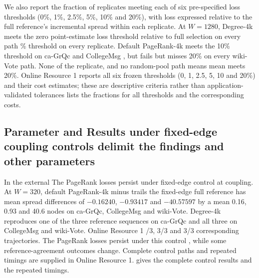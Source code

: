 \documentclass[smallextended]{svjour3}
\providecommand{\DIFaddtex}[1]{{\protect\color{blue} \sf #1}} %
\providecommand{\DIFdeltex}[1]{{\protect\color{red} \scriptsize #1}} %
\providecommand{\DIFaddbegin}{} %
\providecommand{\DIFaddend}{} %
\providecommand{\DIFdelbegin}{} %
\providecommand{\DIFdelend}{} %
\providecommand{\DIFadd}[1]{\texorpdfstring{\DIFaddtex{#1}}{#1}} %
\providecommand{\DIFdel}[1]{\texorpdfstring{\DIFdeltex{#1}}{}} %
\providecommand{\DIFscaledelfig}{0.5}
\newlength{\DIFdelgraphicswidth} %
\newlength{\DIFdelgraphicsheight} %
\providecommand{\DIFaddincludegraphics}[2][]{{\color{blue}\fbox{\DIFOincludegraphics[#1]{#2}}}} %
\providecommand{\DIFdelincludegraphics}[2][]{%
\sbox{\DIFdelgraphicsbox}{\DIFOincludegraphics[#1]{#2}}%
\settoboxwidth{\DIFdelgraphicswidth}{\DIFdelgraphicsbox} %
\settoboxtotalheight{\DIFdelgraphicsheight}{\DIFdelgraphicsbox} %
\scalebox{\DIFscaledelfig}{%
\parbox[b]{\DIFdelgraphicswidth}{\usebox{\DIFdelgraphicsbox}\\[-\baselineskip] \rule{\DIFdelgraphicswidth}{0em}}\llap{\resizebox{\DIFdelgraphicswidth}{\DIFdelgraphicsheight}{%
\setlength{\unitlength}{\DIFdelgraphicswidth}%
\begin{picture}(1,1)%
\thicklines\linethickness{2pt} %
{\color[rgb]{1,0,0}\put(0,0){\framebox(1,1){}}}%
{\color[rgb]{1,0,0}\put(0,0){\line( 1,1){1}}}%
{\color[rgb]{1,0,0}\put(0,1){\line(1,-1){1}}}%
\end{picture}%
}\hspace*{3pt}}} %
} %
\DeclareRobustCommand{\DIFaddbegin}{\DIFOaddbegin \let\includegraphics\DIFaddincludegraphics} %
\DeclareRobustCommand{\DIFaddend}{\DIFOaddend \let\includegraphics\DIFOincludegraphics} %
\DeclareRobustCommand{\DIFdelbegin}{\DIFOdelbegin \let\includegraphics\DIFdelincludegraphics} %
\DeclareRobustCommand{\DIFdelend}{\DIFOaddend \let\includegraphics\DIFOincludegraphics} %
\begin{document}
\DIFaddbegin \DIFadd{We also report the fraction of replicates meeting each of six pre-specified loss thresholds (0\%, 1\%, 2.5\%, 5\%, 10\% and 20\%), with loss expressed relative to the full reference's incremental spread within each replicate. }\DIFaddend At $W=1280$, Degree-4k meets the \DIFdelbegin \DIFdel{zero point-estimate loss threshold relative to full selection on every path}\DIFdelend \DIFaddbegin \DIFadd{0\% threshold on every replicate}\DIFaddend . Default PageRank-4k meets \DIFaddbegin \DIFadd{the }\DIFaddend 10\% \DIFaddbegin \DIFadd{threshold }\DIFaddend on ca-GrQc and CollegeMsg \DIFdelbegin \DIFdel{, but fails }\DIFdelend \DIFaddbegin \DIFadd{but misses }\DIFaddend 20\% on every wiki-Vote \DIFdelbegin \DIFdel{path. None of the }\DIFdelend \DIFaddbegin \DIFadd{replicate, and no }\DIFaddend random-pool \DIFdelbegin \DIFdel{path means }\DIFdelend \DIFaddbegin \DIFadd{mean }\DIFaddend meets 20\%. Online Resource 1 \DIFdelbegin \DIFdel{reports all six frozen thresholds (0, 1, 2.5, 5, 10 and 20\%) and their cost estimates; these are descriptive criteria rather than application-validated tolerances}\DIFdelend \DIFaddbegin \DIFadd{lists the fractions for all thresholds and the corresponding costs}\DIFaddend .

\subsection{\DIFdelbegin \DIFdel{Parameter and }\DIFdelend \DIFaddbegin \DIFadd{Results under fixed-edge }\DIFaddend coupling \DIFdelbegin \DIFdel{controls delimit the findings}\DIFdelend \DIFaddbegin \DIFadd{and other parameters}\DIFaddend }
\DIFdelbegin %

\DIFdel{In the external }\DIFdelend \DIFaddbegin \DIFadd{The PageRank losses persist under }\DIFaddend fixed-edge \DIFdelbegin \DIFdel{control at }\DIFdelend \DIFaddbegin \DIFadd{coupling. At }\DIFaddend $W=320$, default PageRank-4k \DIFdelbegin \DIFdel{minus }\DIFdelend \DIFaddbegin \DIFadd{trails }\DIFaddend the fixed-edge full reference \DIFdelbegin \DIFdel{has mean spread differences of $-0.16240$, $-0.93417$ and $-40.57597$ }\DIFdelend \DIFaddbegin \DIFadd{by a mean 0.16, 0.93 and 40.6 }\DIFaddend nodes on ca-GrQc, CollegeMsg and wiki-Vote. Degree-4k reproduces \DIFaddbegin \DIFadd{one of the three reference sequences on ca-GrQc and all three on CollegeMsg and wiki-Vote. Online Resource }\DIFaddend 1 \DIFdelbegin \DIFdel{/3, 3/3 and 3/3 corresponding trajectories. The PageRank losses persist under this control , while some reference-agreement outcomes change. Complete control paths and repeated timings are supplied in Online Resource 1.
}\DIFdelend \DIFaddbegin \DIFadd{gives the complete control results and the repeated timings.
}\DIFaddend 
\end{document}
